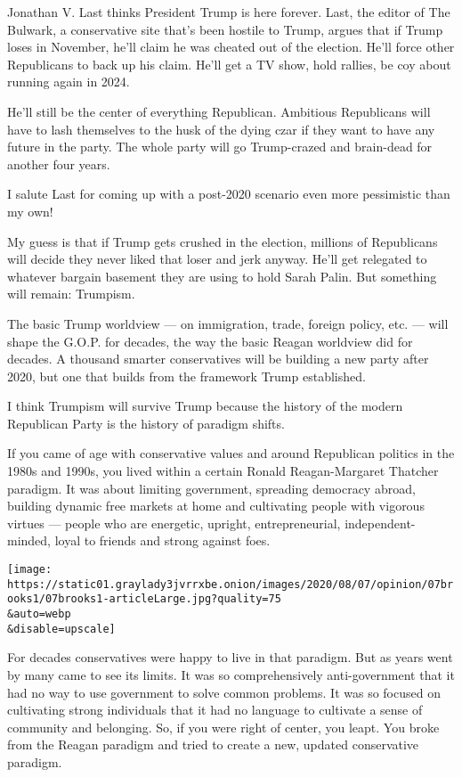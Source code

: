 Jonathan V. Last thinks President Trump is here forever. Last, the
editor of The Bulwark, a conservative site that's been hostile to Trump,
argues that if Trump loses in November, he'll claim he was cheated out
of the election. He'll force other Republicans to back up his claim.
He'll get a TV show, hold rallies, be coy about running again in 2024.

He'll still be the center of everything Republican. Ambitious
Republicans will have to lash themselves to the husk of the dying czar
if they want to have any future in the party. The whole party will go
Trump-crazed and brain-dead for another four years.

I salute Last for coming up with a post-2020 scenario even more
pessimistic than my own!

My guess is that if Trump gets crushed in the election, millions of
Republicans will decide they never liked that loser and jerk anyway.
He'll get relegated to whatever bargain basement they are using to hold
Sarah Palin. But something will remain: Trumpism.

The basic Trump worldview --- on immigration, trade, foreign policy,
etc. --- will shape the G.O.P. for decades, the way the basic Reagan
worldview did for decades. A thousand smarter conservatives will be
building a new party after 2020, but one that builds from the framework
Trump established.

I think Trumpism will survive Trump because the history of the modern
Republican Party is the history of paradigm shifts.

If you came of age with conservative values and around Republican
politics in the 1980s and 1990s, you lived within a certain Ronald
Reagan-Margaret Thatcher paradigm. It was about limiting government,
spreading democracy abroad, building dynamic free markets at home and
cultivating people with vigorous virtues --- people who are energetic,
upright, entrepreneurial, independent-minded, loyal to friends and
strong against foes.

\texttt{[image: https://static01.graylady3jvrrxbe.onion/images/2020/08/07/opinion/07brooks1/07brooks1-articleLarge.jpg?quality=75\\\&auto=webp\\\&disable=upscale]}

For decades conservatives were happy to live in that paradigm. But as
years went by many came to see its limits. It was so comprehensively
anti-government that it had no way to use government to solve common
problems. It was so focused on cultivating strong individuals that it
had no language to cultivate a sense of community and belonging. So, if
you were right of center, you leapt. You broke from the Reagan paradigm
and tried to create a new, updated conservative paradigm.

